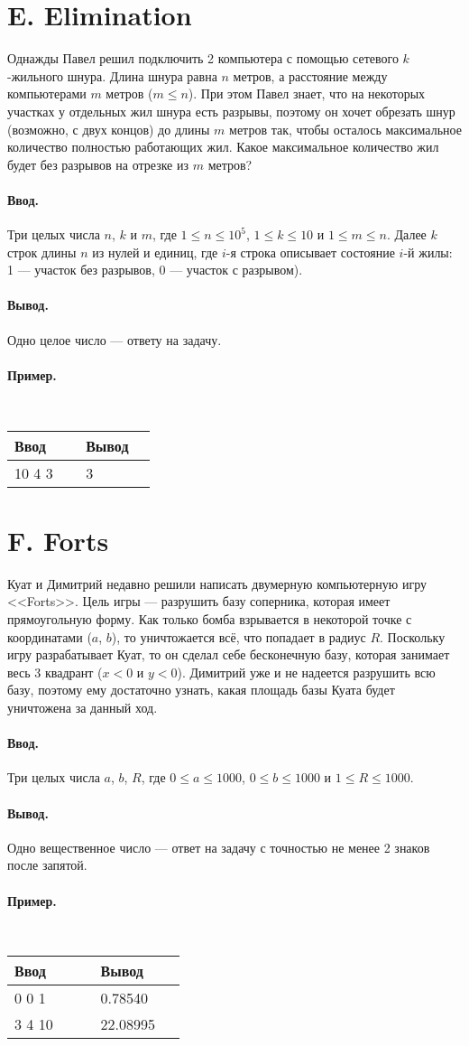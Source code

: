 \documentclass[10pt, a5paper]{article}
\newcommand{\informat}[1]
{
	\paragraph{Ввод.\\} #1
}
\newcommand{\outformat}[1]
{
	\paragraph{Вывод.\\} #1
}
\newcommand{\example}[2]
{
	\paragraph{Пример.\\}
	{\tt
	\begin{tabular}{|p{0.4\linewidth}|p{0.4\linewidth}|}
	\hline
	Ввод & Вывод \\
	\hline
	#1 & #2		\\
	\hline
	\end{tabular}
	}
}
\newcommand{\examplee}[4]
{
	\paragraph{Пример.\\}
	{\tt
	\begin{tabular}{|p{0.4\linewidth}|p{0.4\linewidth}|}
	\hline
	Ввод 	& Вывод  	\\
	\hline
	#1 		& #2 		\\
	\hline
	#3		& #4		\\
	\hline
	\end{tabular}
	}
}
\begin{document}
\section*{E. Elimination}

Однажды Павел решил подключить 2 компьютера с помощью сетевого $k$-жильного шнура. Длина шнура равна $n$ метров, а расстояние между компьютерами $m$ метров ($m \leqslant n$). При этом Павел знает, что на некоторых участках у отдельных жил шнура есть разрывы, поэтому он хочет обрезать шнур (возможно, с двух концов) до длины $m$ метров так, чтобы осталось максимальное количество полностью работающих жил. Какое максимальное количество жил будет без разрывов на отрезке из $m$ метров?

\informat{Три целых числа $n$, $k$ и $m$, где $1 \leqslant n \leqslant 10^5$,  $1 \leqslant k \leqslant 10$ и $1 \leqslant m \leqslant n$. \newline
Далее $k$ строк длины $n$ из нулей и единиц, где $i$-я строка описывает состояние $i$-й жилы: 1 --- участок без разрывов, 0 --- участок с разрывом).
}

\outformat{Одно целое число --- ответу на задачу.}

\example{
10 4 3 \newline
1110111111 \newline
1011111111 \newline
0011111100 \newline
1111110111}
{3}



\section*{F. Forts}

Куат и Димитрий недавно решили написать двумерную компьютерную игру <<Forts>>. Цель игры --- разрушить базу соперника, которая имеет прямоугольную форму. Как только бомба взрывается в некоторой точке с координатами ($a$, $b$), то уничтожается всё, что попадает в радиус $R$. Поскольку игру разрабатывает Куат, то он сделал себе бесконечную базу, которая занимает весь 3 квадрант ($x < 0$ и $y < 0$). Димитрий уже и не надеется разрушить всю базу, поэтому ему достаточно узнать, какая площадь базы Куата будет уничтожена за данный ход.

\informat{Три целых числа $a$, $b$, $R$, где $0 \le a \le 1000$, $0 \le b \le 1000$ и $1 \le R \le 1000$.}

\outformat{Одно вещественное число --- ответ на задачу с точностью не менее 2 знаков после запятой.}

\examplee{0 0 1}{0.78540}{3 4 10}{22.08995}
\end{document}
